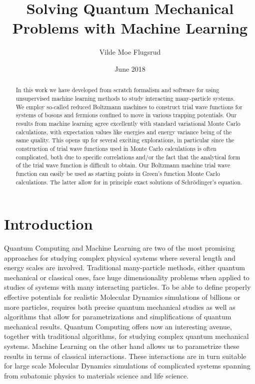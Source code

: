 \documentclass[twoside,english]{uiofysmaster}
\author{Vilde Moe Flugsrud}
\title{Solving Quantum Mechanical Problems with Machine Learning}
\date{June 2018}
\begin{document}
\maketitle

\begin{abstract}
In this work we have developed from scratch formalism and software for
using unsupervised machine learning methods to study interacting
many-particle systems. We employ so-called reduced Boltzmann machines
to construct trial wave functions for systems of bosons and fermions
confined to move in various trapping potentials.  Our results from
machine learning agree excellently with standard variational Monte
Carlo calculations, with expectation values like energies and  energy
variance being of the same quality. This opens up for several exciting
explorations, in particular since the construction of trial wave
functions used in Monte Carlo calculations is often complicated, both
due to specific correlations and/or the fact that the analytical form
of the trial wave function is difficult to obtain. Our Boltzmann
machine trial wave function can easily be used as starting points in
Green's function Monte Carlo calculations. The latter allow for in
principle exact solutions of Schr\"odinger's equation.
\end{abstract}


\tableofcontents

\chapter{Introduction}

Quantum Computing and Machine Learning are two of the most promising
approaches for studying complex physical systems where several length
and energy scales are involved.  Traditional many-particle methods,
either quantum mechanical or classical ones, face huge dimensionality
problems when applied to studies of systems with many interacting
particles. To be able to define properly effective potentials for
realistic Molecular Dynamics simulations of billions or more particles,
requires both precise quantum mechanical studies as well as algorithms
that allow for parametrizations and simplifications of quantum
mechanical results. Quantum Computing offers now an interesting
avenue, together with traditional algorithms, for studying complex
quantum mechanical systems. Machine Learning on the other hand allows us to parametrize
these results in terms of classical interactions. These interactions
are in turn suitable for large scale Molecular Dynamics simulations of
complicated systems spanning from subatomic physics to materials
science and life science.
\end{document}
